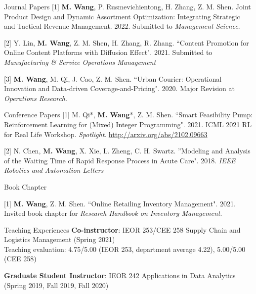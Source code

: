 \documentclass{resume} %
\makeatletter
\def\blfootnote{\xdef\@thefnmark{}\@footnotetext}
\makeatother
\begin{document}

\begin{rSection}{Journal Papers} 
[1] \textbf{M. Wang}, P. Rusmevichientong, H. Zhang, Z. M. Shen. Joint Product Design and Dynamic Assortment Optimization: Integrating Strategic and Tactical Revenue Management. 2022. Submitted to \textit{Management Science}.

[2] Y. Lin, \textbf{M. Wang}, Z. M. Shen, H. Zhang, R. Zhang. ``Content Promotion for Online Content Platforms with Diffusion Effect". 2021. Submitted to \textit{Manufacturing \& Service Operations Management}

[3] \textbf{M. Wang}, M. Qi, J. Cao, Z. M. Shen. ``Urban Courier: Operational Innovation and Data-driven Coverage-and-Pricing". 2020. Major Revision at \textit{Operations Research}.
\end{rSection}

\begin{rSection}{Conference Papers} 
[1] M. Qi*\blfootnote{* denotes alphabetical ordering.}, \textbf{M. Wang}*, Z. M. Shen. ``Smart Feasibility Pump: Reinforcement Learning for (Mixed) Integer Programming". 2021. ICML 2021 RL for Real Life Workshop. \textit{Spotlight}. \url{http://arxiv.org/abs/2102.09663}

[2] N. Chen, \textbf{M. Wang}, X. Xie, L. Zheng, C. H. Swartz. ''Modeling and Analysis of the Waiting Time of Rapid Response Process in Acute Care". 2018. \textit{IEEE Robotics and Automation Letters}
\end{rSection}

\newpage
\begin{rSection}{Book Chapter}

[1] \textbf{M. Wang}, Z. M. Shen. ``Online Retailing Inventory Management". 2021. Invited book chapter for \textit{Research Handbook on Inventory Management}. 

\end{rSection}

\begin{rSection}{Teaching Experiences}
\vspace{1mm}\textbf{Co-instructor}: IEOR 253/CEE 258 Supply Chain and Logistics Management (Spring 2021) \\Teaching evaluation: 4.75/5.00 (IEOR 253, department average 4.22), 5.00/5.00 (CEE 258)

\vspace{1mm}\textbf{Graduate Student Instructor}:
IEOR 242 Applications in Data Analytics (Spring 2019, Fall 2019, Fall 2020)





\end{rSection}
\end{document}
